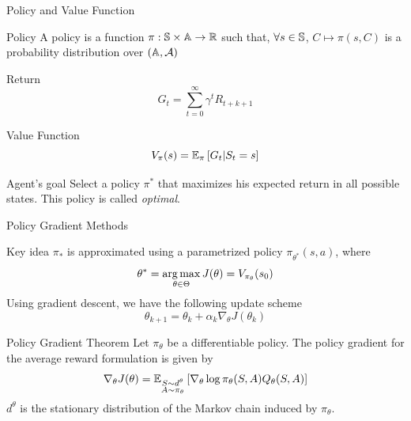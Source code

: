 \begin{frame}{Policy and Value Function}
	\begin{block}{Policy}
		 A policy is a function $\pi: \S \times \A \to \R$ such that, $\forall s \in \S$, $C \mapsto \pi(s,C)$ is a probability distribution over $(\A, \calA)$
	\end{block}
	\begin{block}{Return}
		\begin{equation*}
			G_t = \sum^{\infty}_{t=0} \gamma^t R_{t+k+1} 
		\end{equation*}
	\end{block}
	\begin{block}{Value Function}
		\begin{equation*}
			V_\pi(s) = \E[\pi]{G_t|S_t = s}
		\end{equation*}
	\end{block}
	\begin{block}{Agent's goal}
		Select a policy $\pi^*$ that maximizes his expected return in all possible states. This policy is called \emph{optimal}.
	\end{block}
\end{frame}

\begin{frame}{Policy Gradient Methods}
	\begin{block}{Key idea}
	$\pi_*$ is approximated using a parametrized policy $\pi_{\theta^*}(s,a)$, where
	\begin{equation*}
		\theta^* = \argmax_{\theta \in \Theta} J(\theta) = V_{\pi_\theta}(s_0)
	\end{equation*}
	Using gradient descent, we have the following update scheme
	\begin{equation*}
		\theta_{k+1} = \theta_k + \alpha_k \nabla_\theta J\left(\theta_k\right)
	\end{equation*}
	\end{block}

	\begin{block}{Policy Gradient Theorem}
			Let $\pi_\theta$ be a differentiable policy. The policy gradient for the average reward formulation is given by
			\begin{equation*}
				\nabla_\theta J(\theta) =
				\E[\substack{S \sim d^\theta\\A \sim \pi_\theta}]{\nabla_\theta\log
				\pi_\theta(S,A) Q_{\theta}(S, A)}
			\end{equation*}
			$d^\theta$ is the stationary distribution of the Markov chain induced by $\pi_\theta$.
	\end{block}
\end{frame}

